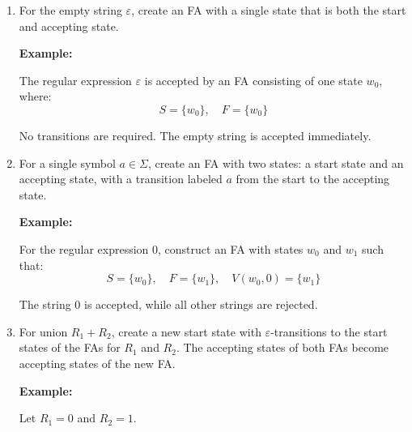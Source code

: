 \documentclass[12pt,a4paper,openany]{article}
\begin{document}
\begin{enumerate}


\item For the empty string $\varepsilon$, create an FA with a single state that is both the start and accepting state.

\textbf{Example:}

The regular expression $\varepsilon$ is accepted by an FA consisting of one state $w_0$, where:
\[
S = \{w_0\}, \quad F = \{w_0\}
\]

\begin{center}
\end{center}

No transitions are required. The empty string is accepted immediately.

\item For a single symbol $a \in \Sigma$, create an FA with two states: a start state and an accepting state, with a transition labeled $a$ from the start to the accepting state.

\textbf{Example:}

For the regular expression $0$, construct an FA with states $w_0$ and $w_1$ such that:
\[
S = \{w_0\}, \quad F = \{w_1\}, \quad V(w_0,0) = \{w_1\}
\]

\begin{center}
\end{center}

The string $0$ is accepted, while all other strings are rejected.

\item For union $R_1 + R_2$, create a new start state with $\varepsilon$-transitions to the start states of the FAs for $R_1$ and $R_2$. The accepting states of both FAs become accepting states of the new FA.

\textbf{Example:}

Let $R_1 = 0$ and $R_2 = 1$.

\begin{center}
\end{center}
\end{enumerate}
\end{document}
